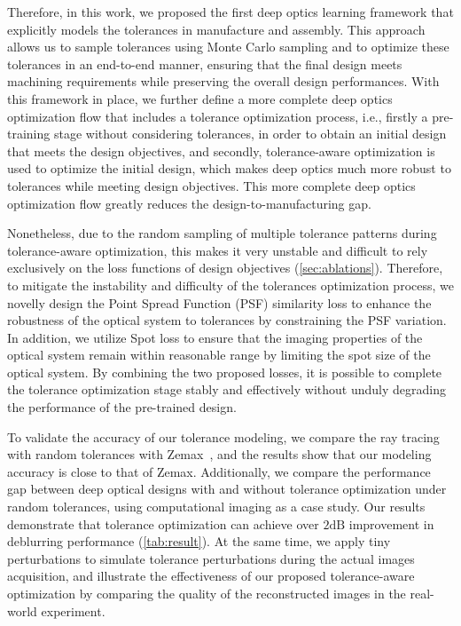 Therefore, in this work, we proposed the first deep optics learning framework that explicitly models the tolerances in manufacture and assembly. This approach allows us to sample tolerances using Monte Carlo sampling and to optimize these tolerances in an end-to-end manner, ensuring that the final design meets machining requirements while preserving the overall design performances. With this framework in place, we further define a more complete deep optics optimization flow that includes a tolerance optimization process, i.e., firstly a pre-training stage without considering tolerances, in order to obtain an initial design that meets the design objectives, and secondly, tolerance-aware optimization is used to optimize the initial design, which makes deep optics much more robust to tolerances while meeting design objectives. This more complete deep optics optimization flow greatly reduces the design-to-manufacturing gap.

Nonetheless, due to the random sampling of multiple tolerance patterns during tolerance-aware optimization, this makes it very unstable and difficult to rely exclusively on the loss functions of design objectives (\cref{sec:ablations}). Therefore, to mitigate the instability and difficulty of the tolerances optimization process, we novelly design the Point Spread Function (PSF) similarity loss to enhance the robustness of the optical system to tolerances by constraining the PSF variation. In addition, we utilize Spot loss to ensure that the imaging properties of the optical system remain within reasonable range by limiting the spot size of the optical system. By combining the two proposed losses, it is possible to complete the tolerance optimization stage stably and effectively without unduly degrading the performance of the pre-trained design.

To validate the accuracy of our tolerance modeling, we compare the ray tracing with random tolerances with Zemax~\cite{ZEMAX}, and the results show that our modeling accuracy is close to that of Zemax. Additionally, we compare the performance gap between deep optical designs with and without tolerance optimization under random tolerances, using computational imaging as a case study. Our results demonstrate that tolerance optimization can achieve over $2\text{dB}$ improvement in deblurring performance (\cref{tab:result}). At the same time, we apply tiny perturbations to simulate tolerance perturbations during the actual images acquisition, and illustrate the effectiveness of our proposed tolerance-aware optimization by comparing the quality of the reconstructed images in the real-world experiment.

